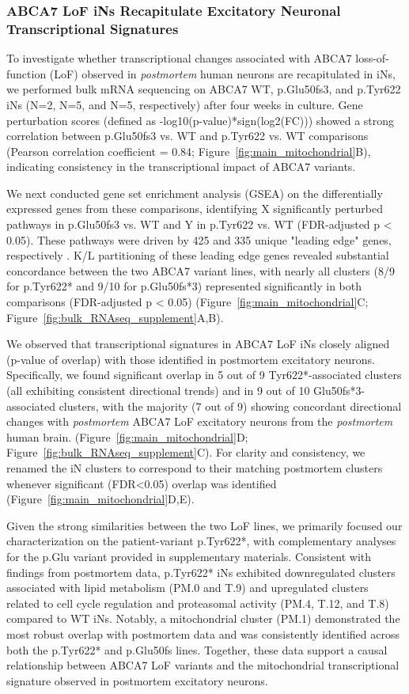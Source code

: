 \subsubsection{ABCA7 LoF iNs Recapitulate Excitatory Neuronal Transcriptional Signatures}
To investigate whether transcriptional changes associated with ABCA7 loss-of-function (LoF) observed in \emph{postmortem} human neurons are recapitulated in iNs, we performed bulk mRNA sequencing on ABCA7 WT, p.Glu50fs3, and p.Tyr622 iNs (N=2, N=5, and N=5, respectively) after four weeks in culture. Gene perturbation scores (defined as -log10(p-value)*sign(log2(FC))) showed a strong correlation between p.Glu50fs3 vs. WT and p.Tyr622 vs. WT comparisons (Pearson correlation coefficient = 0.84; Figure~\ref{fig:main_mitochondrial}B), indicating consistency in the transcriptional impact of ABCA7 variants.

We next conducted gene set enrichment analysis (GSEA) on the differentially expressed genes from these comparisons, identifying X significantly perturbed pathways in p.Glu50fs3 vs. WT and Y in p.Tyr622 vs. WT (FDR-adjusted p < 0.05). These pathways were driven by 425 and 335 unique "leading edge" genes, respectively \cite{Subramanian2005-pu}. K/L partitioning of these leading edge genes revealed substantial concordance between the two ABCA7 variant lines, with nearly all clusters (8/9 for p.Tyr622* and 9/10 for p.Glu50fs*3) represented significantly in both comparisons (FDR-adjusted p < 0.05) (Figure~\ref{fig:main_mitochondrial}C; Figure~\ref{fig:bulk_RNAseq_supplement}A,B).

We observed that transcriptional signatures in ABCA7 LoF iNs closely aligned (p-value of overlap) with those identified in postmortem excitatory neurons. Specifically, we found significant overlap in 5 out of 9 Tyr622*-associated clusters (all exhibiting consistent directional trends) and in 9 out of 10 Glu50fs*3-associated clusters, with the majority (7 out of 9) showing concordant directional changes with \emph{postmortem} ABCA7 LoF excitatory neurons from the \emph{postmortem} human brain. (Figure~\ref{fig:main_mitochondrial}D; Figure~\ref{fig:bulk_RNAseq_supplement}C). For clarity and consistency, we renamed the iN clusters to correspond to their matching postmortem clusters whenever significant (FDR<0.05) overlap was identified (Figure~\ref{fig:main_mitochondrial}D,E).

Given the strong similarities between the two LoF lines, we primarily focused our characterization on the patient-variant p.Tyr622*, with complementary analyses for the p.Glu variant provided in supplementary materials. Consistent with findings from postmortem data, p.Tyr622* iNs exhibited downregulated clusters associated with lipid metabolism (PM.0 and T.9) and upregulated clusters related to cell cycle regulation and proteasomal activity (PM.4, T.12, and T.8) compared to WT iNs. Notably, a mitochondrial cluster (PM.1) demonstrated the most robust overlap with postmortem data and was consistently identified across both the p.Tyr622* and p.Glu50fs lines. Together, these data support a causal relationship between ABCA7 LoF variants and the mitochondrial transcriptional signature observed in postmortem excitatory neurons.

